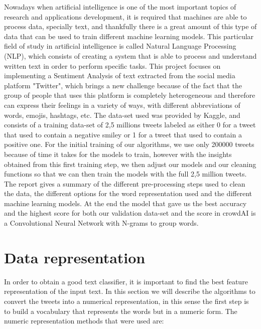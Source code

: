\documentclass[10pt,conference,compsocconf]{IEEEtran}
\begin{document}
Nowadays when artificial intelligence is one of the most important topics of research and applications development, it is required that machines are able to process data, specially text, and thankfully there is a great amount of this type of data that can be used to train different machine learning models. This particular field of study in artificial intelligence is called Natural Language Processing (NLP), which consists of creating a system that is able to process and understand written text in order to perform specific tasks. This project focuses on implementing a Sentiment Analysis of text extracted from the social media platform "Twitter", which brings a new challenge because of the fact that the group of people that uses this platform is completely heterogeneous and therefore can express their feelings in a variety of ways, with different abbreviations of words, emojis, hashtags, etc.
The data-set used was provided by Kaggle, and consists of a training data-set of 2,5 millions tweets labeled as either 0 for a tweet that used to contain a negative smiley or 1 for a tweet that used to contain a positive one. For the initial training of our algorithms, we use only 200000 tweets because of time it takes for the models to train, however with the insights obtained from this first training step, we then adjust our models and our cleaning functions so that we can then train the models with the full 2,5 million tweets. 
The report gives a summary of the different pre-processing steps used to clean the data, the different options for the word representation used and the different machine learning models. 
At the end the model that gave us the best accuracy and the highest score for both our validation data-set and the score in crowdAI\cite{crowdai_01} is a Convolutional Neural Network with N-grams to group words.

\section{Data representation}
In order to obtain a good text classifier, it is important to find the best feature representation of the input text. In this section we will describe the algorithms to convert the tweets into a numerical representation, in this sense the first step is to build a vocabulary that represents the words but in a numeric form.
The numeric representation methods that were used are:
\end{document}
